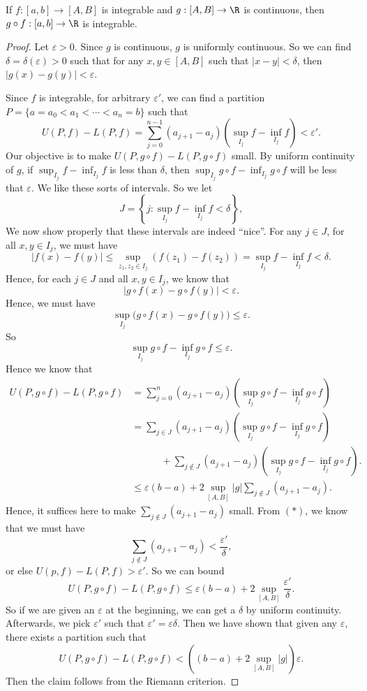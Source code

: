 \documentclass[a4paper]{article}
\begin{document}
\begin{thm}[]
  If $f: [a, b] \to [A, B]$ is integrable and $g: [A, B] \to \R$ is continuous, then $g\circ f: [a, b] \to \R$ is integrable.
\end{thm}

\begin{proof}
  Let $\varepsilon > 0$. Since $g$ is continuous, $g$ is uniformly continuous. So we can find $\delta = \delta(\varepsilon) > 0$ such that for any $x, y\in [A, B]$ such that $|x - y| < \delta$, then $|g(x) - g(y)| < \varepsilon$.

  Since $f$ is integrable, for arbitrary $\varepsilon'$, we can find a partition $P = \{a = a_0 < a_1 < \cdots < a_n = b\}$ such that
  \[
    U(P, f) - L(P, f) = \sum_{j = 0}^{n - 1} (a_{j + 1} - a_j) \left(\sup_{I_j} f - \inf_{I_j} f\right) < \varepsilon'. \tag{$*$}
  \]
  Our objective is to make $U(P, g\circ f) - L(P, g\circ f)$ small. By uniform continuity of $g$, if $\sup_{I_j} f - \inf_{I_j} f$ is less than $\delta$, then $\sup_{I_j} g\circ f - \inf_{I_j} g\circ f$ will be less that $\varepsilon$. We like these sorts of intervals. So we let
  \[
    J = \left\{j: \sup_{I_j} f - \inf_{I_j}f < \delta\right\},
  \]
  We now show properly that these intervals are indeed ``nice''. For any $j \in J$, for all $x, y\in I_j$, we must have
  \[
    |f(x) - f(y)| \leq \sup_{z_1, z_2\in I_j} (f(z_1) - f(z_2)) = \sup_{I_j} f - \inf_{I_j} f < \delta.
  \]
  Hence, for each $j\in J$ and all $x, y\in I_j$, we know that
  \[
    |g\circ f(x) - g\circ f(y)| < \varepsilon.
  \]
  Hence, we must have
  \[
    \sup_{I_j} \Big(g\circ f(x) - g\circ f(y)\Big) \leq \varepsilon.
  \]
  So
  \[
    \sup_{I_j} g\circ f - \inf_{I_j} g\circ f \leq \varepsilon.
  \]
  Hence we know that
  \begin{align*}
    U(P, g\circ f) - L(P, g\circ f) &= \sum_{j = 0}^n (a_{j + 1} - a_j) \left(\sup_{I_j}g\circ f - \inf_{I_j}g\circ f\right)\\
    &= \sum_{j \in J} (a_{j + 1} - a_j) \left(\sup_{I_j}g\circ f - \inf_{I_j}g\circ f\right) \\
    &\quad\quad\quad+ \sum_{j \not\in J} (a_{j + 1} - a_j)\left(\sup_{I_j}g\circ f - \inf_{I_j}g\circ f\right).\\
    &\leq \varepsilon(b - a) + 2\sup_{[A, B]}|g| \sum_{j\not\in J}(a_{j + 1} - a_j).
  \end{align*}
  Hence, it suffices here to make $\sum\limits_{j\not\in J} (a_{j + 1} - a_j)$ small. From $(*)$, we know that we must have
  \[
    \sum_{j \not\in J} (a_{j + 1} - a_j) < \frac{\varepsilon'}{\delta},
  \]
  or else $U(p, f) - L(P, f) > \varepsilon'$. So we can bound
  \[
    U(P, g\circ f) - L(P, g\circ f) \leq \varepsilon(b - a) + 2\sup_{[A, B]} \frac{\varepsilon'}{\delta}.
  \]
  So if we are given an $\varepsilon$ at the beginning, we can get a $\delta$ by uniform continuity. Afterwards, we pick $\varepsilon'$ such that $\varepsilon' = \varepsilon \delta$. Then we have shown that given any $\varepsilon$, there exists a partition such that
  \[
    U(P, g\circ f) - L(P, g\circ f) < \left((b - a) + 2\sup_{[A, B]} |g|\right) \varepsilon.
  \]
  Then the claim follows from the Riemann criterion.
\end{proof}
\end{document}
